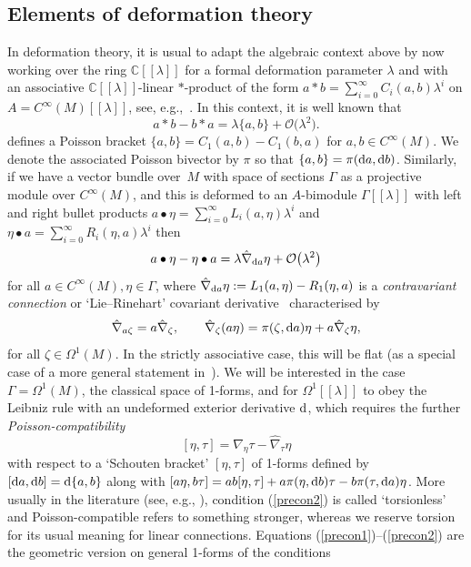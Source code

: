 \documentclass[pdftex]{sigma}
\numberwithin{equation}{section}
\newcommand{\C}{{\mathbb{C}}}
\newcommand{\<}{{\langle}}
\renewcommand{\>}{{\rangle}}
\newcommand{\extd}{{\rm d}}
\begin{document}
\subsection{Elements of deformation theory}\label{secpredef}

In deformation theory, it is usual to adapt the algebraic context above by now working over the ring $\C[[\lambda]]$ for a formal deformation parameter $\lambda$ and with an associative $\C[[\lambda]]$-linear $*$-product of the form $a*b=\sum_{i=0}^\infty C_i(a,b)\lambda^i$ on $A=C^\infty(M)[[\lambda]]$, see, e.g.,~\cite{Bur}. In this context, it is well known that
\[ a* b-b * a=\lambda\lbrace a,b\rbrace+\mathcal{O}\big(\lambda^2\big). \]
defines a Poisson bracket $\{a,b\}=C_1(a,b)-C_1(b,a)$ for $a,b\in C^\infty(M)$. We denote the associated Poisson bivector by $\pi$ so that $\lbrace a,b\rbrace=\pi(\extd a,\extd b)$. Similarly, if we have a vector bundle over~$M$ with space of sections $\Gamma$ as a projective module over $C^\infty(M)$, and this is deformed to an $A$-bimodule $\Gamma[[\lambda]]$ with left and right bullet products $a\bullet \eta=\sum_{i=0}^\infty L_i(a,\eta)\lambda^i$ and $\eta\bullet a=\sum_{i=0}^\infty R_i(\eta,a)\lambda^i$ then
\[a\bullet\eta-\eta\bullet a=\lambda\hat\nabla_{\extd a}\eta+\mathcal{O}\big(\lambda^2\big) \]
for all $a\in C^\infty(M), \eta\in \Gamma$, where $\hat\nabla_{\extd a}\eta:=L_1(a,\eta)-R_1(\eta,a)$ is a {\em contravariant connection} or `Lie--Rinehart' covariant derivative~\cite{Bur,Fer, Hue} characterised by
\begin{equation}\label{precon1} \hat\nabla_{a\zeta}=a\hat\nabla_\zeta,\qquad \hat\nabla_\zeta(a\eta)=\pi(\zeta,\extd a)\eta+ a\hat\nabla_\zeta\eta,\end{equation}
for all $\zeta\in \Omega^1(M)$. In the strictly associative case, this will be flat (as a special case of a more general statement in~\cite{Bur}). We will be interested in the case $\Gamma=\Omega^1(M)$, the classical space of 1-forms, and for $\Omega^1[[\lambda]]$ to obey the Leibniz rule with an undeformed exterior derivative $\extd$, which requires the further {\em Poisson-compatibility}
\begin{equation}\label{precon2} [\eta,\tau]=\hat{\nabla}_\eta\tau-\hat{\nabla}_\tau\eta\end{equation}
with respect to a `Schouten bracket' $[\eta,\tau]$ of 1-forms defined by $[\extd a,\extd b]=\extd\{a,b\}$ along with $[a\eta,b\tau]=ab[\eta,\tau]+a\pi(\eta,\extd b)\tau-b\pi(\tau,\extd a)\eta$. More usually in the literature (see, e.g., \cite{Fer}), condition (\ref{precon2}) is called `torsionless' and Poisson-compatible refers to something stronger, whereas we reserve torsion for its usual meaning for linear connections. Equations (\ref{precon1})--(\ref{precon2}) are the geometric version on general 1-forms of the conditions \cite{BegMa:sem,BegMa:prg, Haw}
\end{document}
